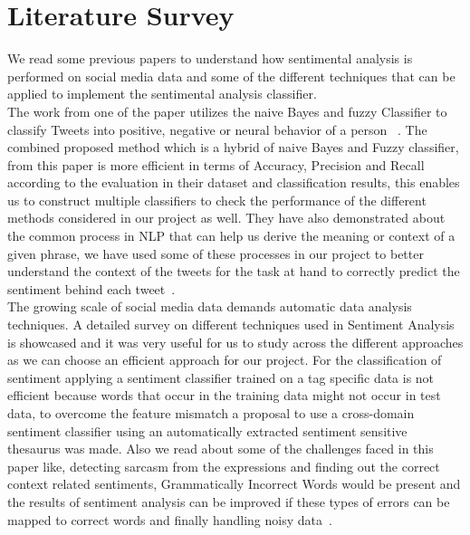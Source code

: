 \section{Literature Survey}
We read some previous papers to understand how sentimental analysis is 
performed on social media data and some of the different techniques that can be 
applied to implement the sentimental analysis classifier.\\

The work from one of the paper utilizes the naive Bayes and fuzzy Classifier to 
classify Tweets into positive, negative or neural behavior of a person ~\cite{hid-sp18-418-fuzzy-naive}. 
The combined proposed method which is a hybrid of naive Bayes and Fuzzy classifier, 
from this paper is more efficient in terms of Accuracy, Precision and Recall according 
to the evaluation in their dataset and classification results, this enables us to construct 
multiple classifiers to check the performance of the different methods 
considered in our project as well. They have also demonstrated about the common 
process in NLP that can help us derive the meaning or context of a given phrase, 
we have used some of these processes in our project to better understand the 
context of the tweets for the task at hand to correctly predict the sentiment 
behind each tweet~\cite{hid-sp18-418-fuzzy-naive}.\\ 
 
The growing scale of social media data demands automatic data analysis techniques. 
A detailed survey on different techniques used in Sentiment Analysis is showcased 
and it was very useful for us to study across the different approaches as we can 
choose an efficient approach for our project. For the classification of sentiment 
applying a sentiment classifier trained on a tag specific data is not efficient 
because words that occur in the training data might not occur in test data, to 
overcome the feature mismatch a proposal to use a cross-domain sentiment classifier 
using an automatically extracted sentiment sensitive thesaurus was made. Also we 
read about some of the challenges faced in this paper like, detecting sarcasm from 
the expressions and finding out the correct context related sentiments, Grammatically 
Incorrect Words would be present and the results of sentiment analysis can be improved 
if these types of errors can be mapped to correct words and finally handling noisy 
data~\cite{hid-sp18-418-sentimental-analysis}. 


